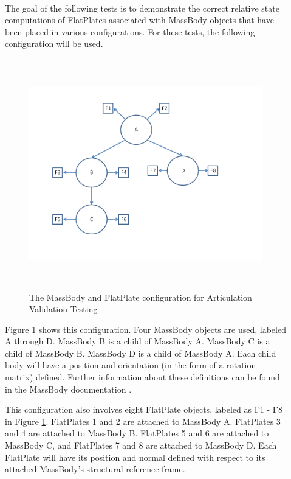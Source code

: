 \begin{description}

\item[] \ \newline

The goal of the following tests is to demonstrate the correct relative state
computations of FlatPlates associated with MassBody objects that
have been placed in various configurations. For these tests,
the following configuration will be used.

\begin{figure}[H]
\begin{center}
\includegraphics[height=100mm]{figs/art_figure.png}
\caption{The MassBody and FlatPlate configuration for Articulation
Validation Testing}
\label{fig:artic_config_1}
\end{center}
\end{figure}

Figure \ref{fig:artic_config_1} shows this configuration. Four MassBody
objects are used, labeled A through D. MassBody B is a child of
MassBody A. MassBody C is a child of MassBody B. MassBody D is
a child of MassBody A. Each child body will have a position and
orientation (in the form of a rotation matrix) defined. Further information
about these definitions can be found in the MassBody documentation
\cite{dynenv:MASS}.

This configuration also involves eight FlatPlate objects, labeled as
F1 - F8 in Figure \ref{fig:artic_config_1}. FlatPlates 1 and 2 are
attached to MassBody A. FlatPlates 3 and 4 are attached to MassBody B.
FlatPlates 5 and 6 are attached to MassBody C, and FlatPlates 7 and 8
are attached to MassBody D. Each FlatPlate will have its position and
normal defined with respect to its attached MassBody's structural
reference frame.


\end{description}
